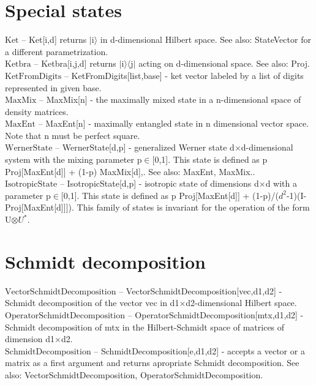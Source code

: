 \documentclass[a4paper,10pt]{scrartcl}
\begin{document}
\section{Special states}

\noindent\textbf{$ \text{Ket} $ }-- Ket[i,d] returns $|$i$\rangle $ in d-dimensional Hilbert space. See also: StateVector for a different parametrization.$  $\\[8pt]
\noindent\textbf{$ \text{Ketbra} $ }-- Ketbra[i,j,d] returns $|$i$\rangle \langle $j$|$ acting on d-dimensional space. See also: Proj.$  $\\[8pt]
\noindent\textbf{$ \text{KetFromDigits} $ }-- KetFromDigits[list,base] - ket vector labeled by a list of digits represented in given base.$  $\\[8pt]
\noindent\textbf{$ \text{MaxMix} $ }-- MaxMix[n] - the maximally mixed state in a n-dimensional space of density matrices.$  $\\[8pt]
\noindent\textbf{$ \text{MaxEnt} $ }-- MaxEnt[n] - maximally entangled state in n dimensional vector space. Note that n must be perfect square.$  $\\[8pt]
\noindent\textbf{$ \text{WernerState} $ }-- WernerState[d,p] - generalized Werner state d$\times $d-dimensional system with the mixing parameter p$\in $[0,1]. This state is defined as p Proj[MaxEnt[d]] + (1-p) MaxMix[d],. See also: MaxEnt, MaxMix..$  $\\[8pt]
\noindent\textbf{$ \text{IsotropicState} $ }-- IsotropicState[d,p] - isotropic state of dimensions d$\times $d with a parameter p$\in $[0,1]. This state is defined as p Proj[MaxEnt[d]] + (1-p)/($ d^2 $-1)(I-Proj[MaxEnt[d]]]). This family of states is invariant for the operation of the form U$\otimes $$ U^*. $\\[8pt]
\section{Schmidt decomposition}

\noindent\textbf{$ \text{VectorSchmidtDecomposition} $ }-- VectorSchmidtDecomposition[vec,d1,d2] - Schmidt decomposition of the vector vec in d1$\times $d2-dimensional Hilbert space.$  $\\[8pt]
\noindent\textbf{$ \text{OperatorSchmidtDecomposition} $ }-- OperatorSchmidtDecomposition[mtx,d1,d2] - Schmidt decomposition of mtx in the Hilbert-Schmidt space of matrices of dimension d1$\times $d2.$  $\\[8pt]
\noindent\textbf{$ \text{SchmidtDecomposition} $ }-- SchmidtDecomposition[e,d1,d2] - accepts a vector or a matrix as a first argument and returns apropriate Schmidt decomposition. See also: VectorSchmidtDecomposition, OperatorSchmidtDecomposition.$  $\\[8pt]
\end{document}

